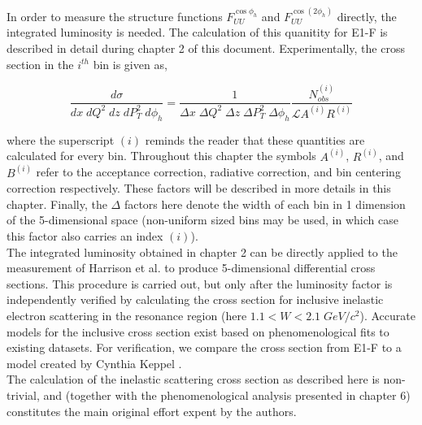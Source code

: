 In order to measure the structure functions $F_{UU}^{\cos\phi_h}$ and $F_{UU}^{\cos(2\phi_h)}$ directly, the integrated luminosity is needed.  The calculation of this quanitity for E1-F is described in detail during chapter 2 of this document.  Experimentally, the cross section in the $i^{th}$ bin is given as, 

\begin{equation}
	\frac{d\sigma}{dx \; dQ^2 \; dz \; dP_T^2 \; d\phi_h} = \frac{1}{\Delta x \; \Delta Q^2 \; \Delta z \; \Delta P_T^2 \; \Delta \phi_h} \frac{N_{obs}^{(i)}}{\mathcal{L} A^{(i)} R^{(i)}} 
\end{equation}

where the superscript $(i)$ reminds the reader that these quantities are calculated for every bin.  Throughout this chapter the symbols $A^{(i)}$, $R^{(i)}$, and $B^{(i)}$ refer to the acceptance correction, radiative correction, and bin centering correction respectively.  These factors will be described in more details in this chapter. Finally, the $\Delta$ factors here denote the width of each bin in 1 dimension of the 5-dimensional space (non-uniform sized bins may be used, in which case this factor also carries an index $(i)$).\\

The integrated luminosity obtained in chapter 2 can be directly applied to the measurement of Harrison et al. to produce 5-dimensional differential cross sections.  This procedure is carried out, but only after the luminosity factor is independently verified by calculating the cross section for inclusive inelastic electron scattering in the resonance region (here $1.1 < W < 2.1 \; GeV/c^2$).  Accurate models for the inclusive cross section exist based on phenomenological fits to existing datasets.  For verification, we compare the cross section from E1-F to a model created by Cynthia Keppel \cite{find-keppel-reference}. \\

The calculation of the inelastic scattering cross section as described here is non-trivial, and (together with the phenomenological analysis presented in chapter 6) constitutes the main original effort expent by the authors.    

